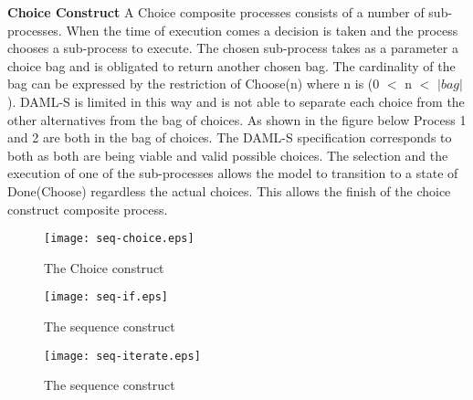 \textbf{Choice Construct} A Choice composite processes consists of a number of sub-processes. When the time of execution comes a decision is taken and the process chooses a sub-process to execute. The chosen sub-process takes as a parameter a choice bag and is obligated to return another chosen bag. The cardinality of the bag can be expressed by the restriction of Choose(n) where n is (0 $<$ n $<$ $|bag|$). DAML-S is limited in this way and is not able to separate each choice from the other alternatives from the bag of choices. As shown in the figure below Process 1 and 2 are both in the bag of choices. The DAML-S specification corresponds to both as both are being viable and valid possible choices. The selection and the execution of one of the sub-processes allows the model to transition to a state of Done(Choose) regardless the actual choices. This allows the finish of the choice construct composite process.
\begin{figure}[h]
    \centering
    \texttt{[image: seq-choice.eps]}
    \caption{The Choice construct}
    \label{fig:Conditional effects and outputs}
\end{figure}

\begin{figure}[h]
    \centering
    \texttt{[image: seq-if.eps]}
    \caption{The sequence construct}
    \label{fig:Conditional effects and outputs}
\end{figure}

\begin{figure}[h]
    \centering
    \texttt{[image: seq-iterate.eps]}
    \caption{The sequence construct}
    \label{fig:Conditional effects and outputs}
\end{figure}